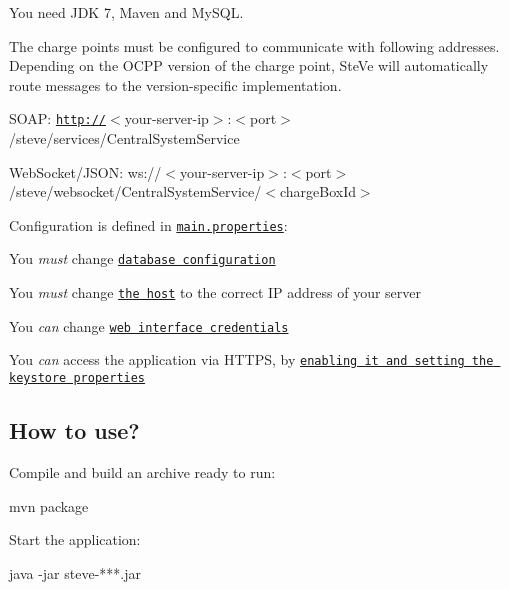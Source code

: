 \begin{DoxyEnumerate}
\item You need J\-D\-K 7, Maven and My\-S\-Q\-L.
\item The charge points must be configured to communicate with following addresses. Depending on the O\-C\-P\-P version of the charge point, Ste\-Ve will automatically route messages to the version-\/specific implementation.
\begin{DoxyItemize}
\item S\-O\-A\-P\-: {\ttfamily \href{http://}{\tt http\-://}$<$your-\/server-\/ip$>$\-:$<$port$>$/steve/services/\-Central\-System\-Service}
\item Web\-Socket/\-J\-S\-O\-N\-: {\ttfamily ws\-://$<$your-\/server-\/ip$>$\-:$<$port$>$/steve/websocket/\-Central\-System\-Service/$<$charge\-Box\-Id$>$}
\end{DoxyItemize}
\item Configuration is defined in \href{src/main/resources/main.properties}{\tt main.\-properties}\-:
\begin{DoxyItemize}
\item You {\itshape must} change \href{src/main/resources/main.properties#L3-L5}{\tt database configuration}
\item You {\itshape must} change \href{src/main/resources/main.properties#L14}{\tt the host} to the correct I\-P address of your server
\item You {\itshape can} change \href{src/main/resources/main.properties#L9-L10}{\tt web interface credentials}
\item You {\itshape can} access the application via H\-T\-T\-P\-S, by \href{src/main/resources/main.properties#L23-L26}{\tt enabling it and setting the keystore properties}
\end{DoxyItemize}
\end{DoxyEnumerate}

\subsection*{How to use? }

Compile and build an archive ready to run\-: \begin{DoxyVerb}mvn package
\end{DoxyVerb}


Start the application\-: \begin{DoxyVerb}java -jar steve-***.jar
\end{DoxyVerb}


